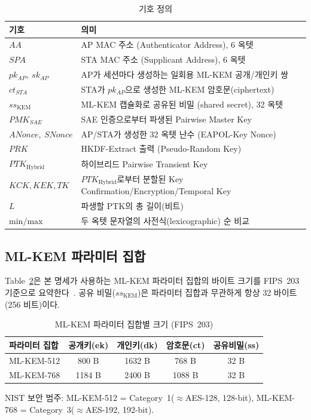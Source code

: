 \documentclass[11pt]{article}
\newcommand{\pkAP}{\ensuremath{pk_{AP}}}
\newcommand{\skAP}{\ensuremath{sk_{AP}}}
\newcommand{\ctSTA}{\ensuremath{ct_{STA}}}
\newcommand{\ssK}{\ensuremath{ss_{\mathrm{KEM}}}}
\newcommand{\pmkSAE}{\ensuremath{PMK_{SAE}}}
\newcommand{\ptkH}{\ensuremath{PTK_{\mathrm{Hybrid}}}}
\newcommand{\ANonce}{\ensuremath{ANonce}}
\newcommand{\SNonce}{\ensuremath{SNonce}}
\theoremstyle{definition}
\theoremstyle{plain}
\begin{document}
\begin{table}[H]\centering
\caption{기호 정의}\label{tab:notation}
\small
\begin{tabularx}{\linewidth}{@{}lX@{}}
\toprule
기호 & 의미 \\ \midrule
$AA$ & AP MAC 주소 (Authenticator Address), 6 옥텟 \\
$SPA$ & STA MAC 주소 (Supplicant Address), 6 옥텟 \\
$\pkAP,\ \skAP$ & AP가 세션마다 생성하는 일회용 ML-KEM 공개/개인키 쌍 \\
$\ctSTA$ & STA가 \pkAP{}으로 생성한 ML-KEM 암호문(ciphertext) \\
$\ssK$ & ML-KEM 캡슐화로 공유된 비밀 (shared secret), 32 옥텟 \\
$\pmkSAE$ & SAE 인증으로부터 파생된 Pairwise Master Key \\
$\ANonce,\ \SNonce$ & AP/STA가 생성한 32 옥텟 난수 (EAPOL-Key Nonce) \\
$PRK$ & HKDF-Extract 출력 (Pseudo-Random Key) \\
$\ptkH$ & 하이브리드 Pairwise Transient Key \\
$KCK,KEK,TK$ & \ptkH{}로부터 분할된 Key Confirmation/Encryption/Temporal Key \\
$L$ & 파생할 PTK의 총 길이(비트) \\
$\mathrm{min}/\mathrm{max}$ & 두 옥텟 문자열의 사전식(lexicographic) 순 비교 \\
\bottomrule
\end{tabularx}
\end{table}

\subsection{ML-KEM 파라미터 집합}\label{sec:mlkem}
Table~\ref{tab:mlkem}은 본 명세가 사용하는 ML-KEM 파라미터 집합의 바이트
크기를 FIPS~203 기준으로 요약한다~\cite{fips203}. 공유 비밀(\ssK)은 파라미터
집합과 무관하게 항상 32 바이트(256 비트)이다.

\begin{table}[H]\centering
\caption{ML-KEM 파라미터 집합별 크기 (FIPS~203)}\label{tab:mlkem}
\small
\begin{tabular}{@{}lcccc@{}}
\toprule
파라미터 집합 & 공개키(ek) & 개인키(dk) & 암호문(ct) & 공유비밀(ss) \\ \midrule
ML-KEM-512 & 800 B & 1632 B & 768 B & 32 B \\
ML-KEM-768 & 1184 B & 2400 B & 1088 B & 32 B \\ \bottomrule
\end{tabular}
\par\smallskip
\footnotesize NIST 보안 범주: ML-KEM-512 = Category~1($\approx$AES-128, 128-bit),
ML-KEM-768 = Category~3($\approx$AES-192, 192-bit).
\end{table}
\end{document}
